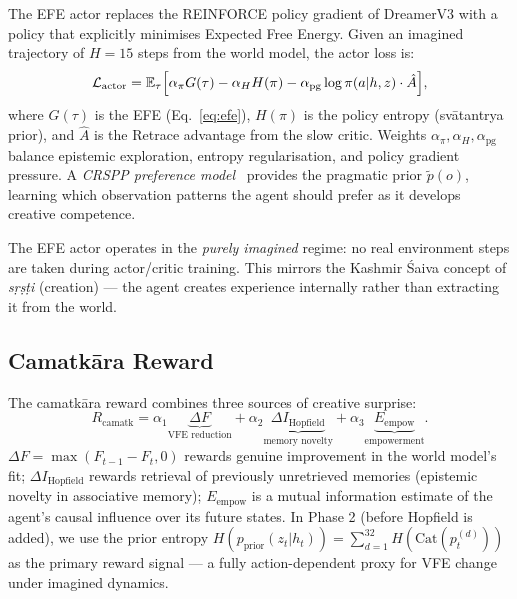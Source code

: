 \documentclass[journal,onecolumn,11pt]{IEEEtran}
\begin{document}
The EFE actor replaces the REINFORCE policy gradient of DreamerV3 with a
policy that explicitly minimises Expected Free Energy.
Given an imagined trajectory of $H = 15$ steps from the world model,
the actor loss is:
%
\begin{equation}
  \mathcal{L}_{\text{actor}} = \mathbb{E}_\tau
    \Bigl[\alpha_\pi G(\tau) - \alpha_H H(\pi) - \alpha_{\text{pg}}
    \log\pi(a|h,z)\cdot\hat{A}\Bigr],
\end{equation}
%
where $G(\tau)$ is the EFE (Eq.~\eqref{eq:efe}), $H(\pi)$ is the policy
entropy (svātantrya prior), and $\hat{A}$ is the Retrace advantage from the
slow critic.
Weights $\alpha_\pi, \alpha_H, \alpha_{\text{pg}}$ balance epistemic exploration,
entropy regularisation, and policy gradient pressure.
A \emph{CRSPP preference model}~\cite{crspp2023} provides the pragmatic
prior $\tilde{p}(o)$, learning which observation patterns the agent should
prefer as it develops creative competence.

The EFE actor operates in the \emph{purely imagined} regime: no real environment
steps are taken during actor/critic training.
This mirrors the Kashmir Śaiva concept of \emph{sṛṣṭi} (creation) — the agent
creates experience internally rather than extracting it from the world.

\subsection{Camatkāra Reward}\label{sec:camatk}

The camatkāra reward combines three sources of creative surprise:
%
\begin{equation}
  R_{\text{camatk}} = \alpha_1\underbrace{\Delta F}_{\text{VFE reduction}}
    + \alpha_2\underbrace{\Delta I_{\text{Hopfield}}}_{\text{memory novelty}}
    + \alpha_3\underbrace{E_{\text{empow}}}_{\text{empowerment}}.
  \label{eq:camatk}
\end{equation}
%
$\Delta F = \max(F_{t-1} - F_t, 0)$ rewards genuine improvement in the
world model's fit; $\Delta I_{\text{Hopfield}}$ rewards retrieval of
previously unretrieved memories (epistemic novelty in associative memory);
$E_{\text{empow}}$ is a mutual information estimate of the agent's causal
influence over its future states.
In Phase 2 (before Hopfield is added), we use the prior entropy
$H(p_{\text{prior}}(z_t|h_t)) = \sum_{d=1}^{32} H(\text{Cat}(p^{(d)}_t))$
as the primary reward signal — a fully action-dependent proxy for VFE
change under imagined dynamics.
\end{document}
